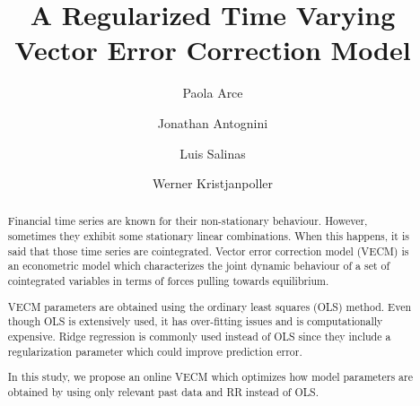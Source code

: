 \documentclass[12pt,reqno]{amsart}
\title{A Regularized Time Varying Vector Error Correction Model}
\author{Paola Arce \and Jonathan Antognini \and Luis Salinas \and Werner Kristjanpoller}
\begin{document}
\maketitle

\begin{abstract}
Financial time series are known for their non-stationary behaviour. However,
sometimes they exhibit some stationary linear combinations. When this happens,
it is said that those time series are cointegrated. Vector error correction
model (VECM) is an econometric model which characterizes the joint dynamic
behaviour of a set of cointegrated variables in terms of forces pulling towards
equilibrium. 

VECM parameters are obtained using the ordinary least squares (OLS)
method.  Even though OLS is extensively used, it has over-fitting
issues and is computationally expensive. Ridge regression is commonly used
instead of OLS since they include a regularization parameter which could improve
prediction error.

In this study, we propose an online VECM which optimizes how model parameters
are obtained by using only relevant past data and RR instead of OLS.  
\end{abstract}




%
%
%


%
%
%
%
%
%
%
\end{document}
